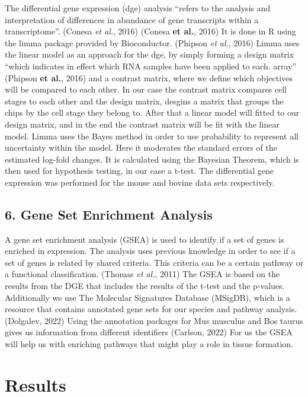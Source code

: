 \documentclass[
  parskip,
  oneside]{scrreprt}
\begin{document}
The differential gene expression (dge) analysis ``refers to the analysis
and interpretation of differences in abundance of gene transcripts
within a transcriptome''. (Conesa \emph{et al.}, 2016) (Conesa
\textbf{et al.}, 2016) It is done in R using the limma package provided
by Bioconductor. (Phipson \emph{et al.}, 2016) Limma uses the linear
model as an approach for the dge, by simply forming a design matrix
``which indicates in effect which RNA samples have been applied to each.
array'' (Phipson \textbf{et al.}, 2016) and a contrast matrix, where we
define which objectives will be compared to each other. In our case the
contrast matrix compares cell stages to each other and the design
matrix, desgins a matrix that groups the chips by the cell stage they
belong to. After that a linear model will fitted to our design matrix,
and in the end the contrast matrix will be fit with the linear model.
Limma uses the Bayes method in order to use probability to represent all
uncertainty within the model. Here it moderates the standard errors of
the estimated log-fold changes. It is calculated using the Bayesian
Theorem, which is then used for hypothesis testing, in our case a
t-test. The differential gene expression was performed for the mouse and
bovine data sets respectively.

\hypertarget{gene-set-enrichment-analysis}{%
\section{6. Gene Set Enrichment
Analysis}\label{gene-set-enrichment-analysis}}

A gene set enrichment analysis (GSEA) is used to identify if a set of
genes is enriched in expression. The analysis uses previous knowledge in
order to see if a set of genes is related by shared criteria. This
criteria can be a certain pathway or a functional classification.
(Thomas \emph{et al.}, 2011) The GSEA is based on the results from the
DGE that includes the results of the t-test and the p-values.
Additionally we use The Molecular Signatures Database (MSigDB), which is
a resource that contains annotated gene sets for our species and pathway
analysis. (Dolgalev, 2022) Using the annotation packages for Mus
musculus and Bos taurus gives us information from different identifiers
(Carlson, 2022) For us the GSEA will help us with enriching pathways
that might play a role in tissue formation.

\hypertarget{results}{%
\chapter{Results}\label{results}}
\end{document}
